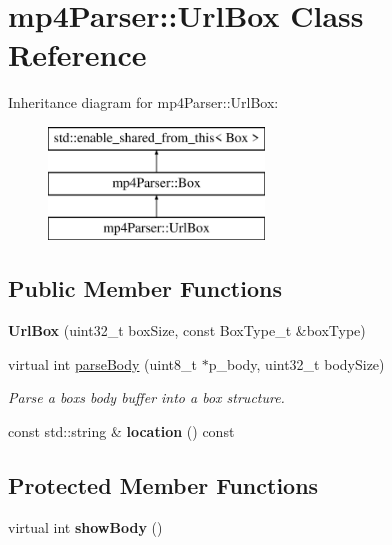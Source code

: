 \hypertarget{classmp4_parser_1_1_url_box}{}\section{mp4\+Parser\+::Url\+Box Class Reference}
\label{classmp4_parser_1_1_url_box}
Inheritance diagram for mp4\+Parser\+::Url\+Box\+:\begin{figure}[H]
\begin{center}
\leavevmode
\includegraphics[height=3.000000cm]{classmp4_parser_1_1_url_box}
\end{center}
\end{figure}
\subsection*{Public Member Functions}
\begin{DoxyCompactItemize}
\item 
\mbox{\label{classmp4_parser_1_1_url_box_a097a942f5589d3b036c0ac3978e5a62b}} 
{\bfseries Url\+Box} (uint32\+\_\+t box\+Size, const Box\+Type\+\_\+t \&box\+Type)
\item 
virtual int \mbox{\hyperlink{classmp4_parser_1_1_url_box_a150ab47ee00eca2f2f6c37ae12946cf6}{parse\+Body}} (uint8\+\_\+t $\ast$p\+\_\+body, uint32\+\_\+t body\+Size)
\begin{DoxyCompactList}\small\item\em Parse a box\textquotesingle{}s body buffer into a box structure. \end{DoxyCompactList}\item 
\mbox{\label{classmp4_parser_1_1_url_box_a9d97651b8d36385c31699acccab0cb5e}} 
const std\+::string \& {\bfseries location} () const
\end{DoxyCompactItemize}
\subsection*{Protected Member Functions}
\begin{DoxyCompactItemize}
\item 
\mbox{\label{classmp4_parser_1_1_url_box_a5f03074a824570cb4579fb7e52fb3c22}} 
virtual int {\bfseries show\+Body} ()
\end{DoxyCompactItemize}
